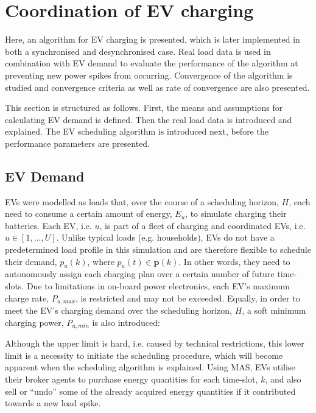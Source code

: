 \section{Coordination of EV charging}
\label{ch3:sec:ev-coordination}

Here, an algorithm for EV charging is presented, which is later implemented in both a synchronised and desynchronised case.
Real load data is used in combination with EV demand to evaluate the performance of the algorithm at preventing new power spikes from occurring.
Convergence of the algorithm is studied and convergence criteria as well as rate of convergence are also presented.

This section is structured as follows.
First, the means and assumptions for calculating EV demand is defined.
Then the real load data is introduced and explained.
The EV scheduling algorithm is introduced next, before the performance parameters are presented.

\subsection{EV Demand}

EVs were modelled as loads that, over the course of a scheduling horizon, $H$, each need to consume a certain amount of energy, $E_u$, to simulate charging their batteries.
Each EV, i.e. $u$, is part of a fleet of charging and coordinated EVs, i.e. $u \in [1, \dots, U]$.
Unlike typical loads (e.g. households), EVs do not have a predetermined load profile in this simulation and are therefore flexible to schedule their demand, $p_u(k)$, where $p_u(t) \in \textbf{p}(k)$.
In other words, they need to autonomously assign each charging plan over a certain number of future time-slots.
Due to limitations in on-board power electronics, each EV's maximum charge rate, $P_{u,max}$, is restricted and may not be exceeded.
Equally, in order to meet the EV's charging demand over the scheduling horizon, $H$, a soft minimum charging power, $P_{u,min}$ is also introduced:



Although the upper limit is hard, i.e. caused by technical restrictions, this lower limit is a necessity to initiate the scheduling procedure, which will become apparent when the scheduling algorithm is explained.
Using MAS, EVs utilise their broker agents to purchase energy quantities for each time-slot, $k$, and also sell or ``undo'' some of the already acquired energy quantities if it contributed towards a new load spike.

